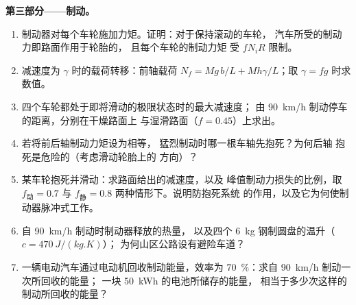 \begin{problem}
\medskip
\noindent\textbf{第三部分——制动。}
\begin{enumerate}[resume]
  \item 制动器对每个车轮施加力矩。证明：对于保持滚动的车轮，
        汽车所受的制动力即路面作用于轮胎的，
        且每个车轮的制动力矩
        受 $fN_iR$ 限制。
  \item 减速度为 $\gamma$ 时的载荷转移：前轴载荷
        $N_f = Mg\,b/L + Mh\gamma/L$；取 $\gamma = fg$ 时求数值。
  \item 四个车轮都处于即将滑动的极限状态时的最大减速度；
        由 \qty{90}{km/h} 制动停车的距离，分别在干燥路面上
        与湿滑路面（$f = 0.45$）上求出。
  \item 若将前后轴制动力矩设为相等，
        猛烈制动时哪一根车轴先抱死？为何后轴
        抱死是危险的（考虑滑动轮胎上的
        方向）？
  \item 某车轮抱死并滑动：求路面给出的减速度，以及
        峰值制动力损失的比例，取 $f_{\text{动}} =
        0.7$ 与 $f_{\text{静}} = 0.8$ 两种情形下。说明防抱死系统
        的作用，以及它为何使制动器脉冲式工作。
  \item 自 \qty{90}{km/h} 制动时制动器释放的热量，
        以及四个 \qty{6}{kg} 钢制圆盘的温升（$c = \qty{470}{J/(kg.K)}$）；
        为何山区公路设有避险车道？
  \item 一辆电动汽车通过电动机回收制动能量，效率为
        \qty{70}{\%}：求自 \qty{90}{km/h} 制动一次所回收的能量；
        一块 \qty{50}{kWh} 的电池所储存的能量，
        相当于多少次这样的制动所回收的能量？
\end{enumerate}


\end{problem}
